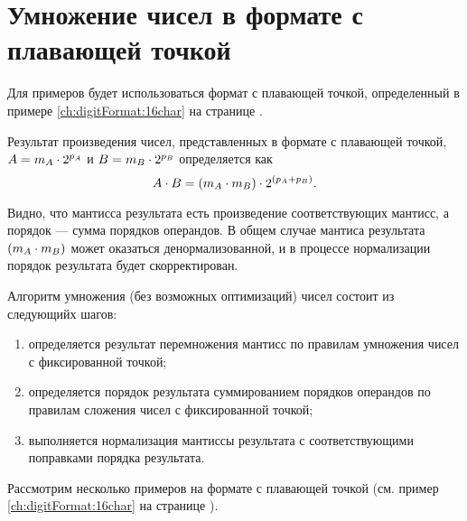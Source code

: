 \section{Умножение чисел в формате с плавающей точкой}
\label{ch::float}

Для примеров будет использоваться формат с плавающей точкой, определенный в примере \ref{ch:digitFormat:16char} на странице \pageref{ch:digitFormat:16char}.

Результат произведения чисел, представленных в формате с плавающей точкой, $A=m_{A}\cdot {2}^{p_{A}}$ и $B=m_{B}\cdot {2}^{p_{B}}$ определяется как
\[
   A\cdot B= (m_{A}\cdot m_{B})\cdot 2^{(p_{A} + p_{B})}.
\]

Видно, что мантисса результата есть произведение соответствующих мантисс, а порядок --- сумма порядков операндов. В общем случае мантиса результата $(m_{A}\cdot m_{B})$ может оказаться денормализованной, и в процессе нормализации порядок результата будет скорректирован.

Алгоритм умножения (без возможных оптимизаций) чисел состоит из следующийх шагов:
\begin{enumerate}
   \item определяется результат перемножения мантисс по правилам умножения чисел с фиксированной точкой;
   \item определяется порядок результата суммированием порядков операндов по правилам сложения чисел с фиксированной точкой;
   \item выполняется нормализация мантиссы результата с соответствующими поправками порядка результата.
\end{enumerate}

Рассмотрим несколько примеров на формате с плавающей точкой (см. пример \ref{ch:digitFormat:16char} на странице \pageref{ch:digitFormat:16char}).

